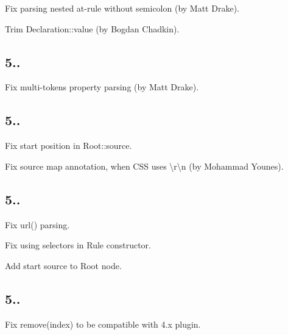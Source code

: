 \begin{DoxyItemize}
\item Fix parsing nested at-\/rule without semicolon (by Matt Drake).
\item Trim {\ttfamily Declaration\+::value} (by Bogdan Chadkin).
\end{DoxyItemize}

\subsection*{5..}


\begin{DoxyItemize}
\item Fix multi-\/tokens property parsing (by Matt Drake).
\end{DoxyItemize}

\subsection*{5..}


\begin{DoxyItemize}
\item Fix start position in {\ttfamily Root\+::source}.
\item Fix source map annotation, when C\+SS uses {\ttfamily \textbackslash{}r\textbackslash{}n} (by Mohammad Younes).
\end{DoxyItemize}

\subsection*{5..}


\begin{DoxyItemize}
\item Fix {\ttfamily url()} parsing.
\item Fix using {\ttfamily selectors} in {\ttfamily Rule} constructor.
\item Add start source to {\ttfamily Root} node.
\end{DoxyItemize}

\subsection*{5..}


\begin{DoxyItemize}
\item Fix {\ttfamily remove(index)} to be compatible with 4.\+x plugin.
\end{DoxyItemize}

